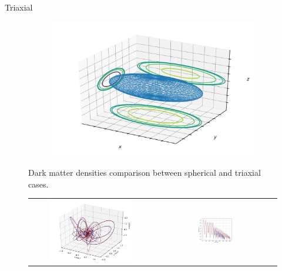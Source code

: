 \documentclass{beamer}
\begin{document}
\begin{frame}{Triaxial}
\begin{figure}[h]
\begin{subfigure}[t]{0.6\textwidth}
			\includegraphics[width=\textwidth]{"../Files/Week 7/ellipsoid_"}
		\end{subfigure}
		\caption{Dark matter densities comparison between spherical and triaxial cases.}
		\label{fig: symmetricTriaxial}
	\end{figure}
\end{frame}

\begin{frame}
	\begin{figure}[h]
		\begin{tabular}{cc}
			\includegraphics[width = 0.7\textwidth]{"../Files/Week 10/3dorbit"} &
			\includegraphics[width = 0.3\textwidth]{"../Files/Week 10/3dorbit_distances"}
		\end{tabular}
	\end{figure}
\end{frame}
\end{document}

